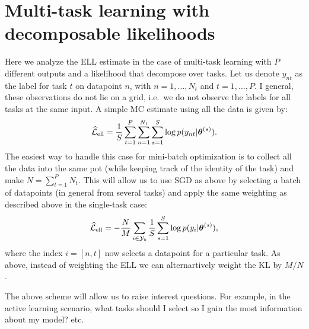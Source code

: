 \documentclass[11pt,a4paper]{article}
\newcommand{\vectheta}{\vecS{\theta}}
\newcommand{\slikesample}[2]{\log p(y_{#1}|\vectheta^{(#2)})}
\newcommand{\elltermhat}{{\widehat{\mathcal{L}}}_{\text{ell}}}
\newcommand{\batch}[1]{{\mathcal{Y}}_{#1}}
\begin{document}
\section{Multi-task learning with decomposable likelihoods}
Here we analyze the ELL estimate in the case of multi-task learning with $P$ different outputs and a likelihood that decompose over tasks. Let us denote $y_{nt}$ as the label for task $t$ on datapoint $n$, with $n=1,\ldots, N_t$ and  $t=1, \ldots, P$. I general, these observations do not lie on a grid, i.e.~we do not observe the labels for all tasks at the same input. A simple MC estimate using all the data is given by:
\begin{align}
	\elltermhat = \frac{1}{S} \sum_{t=1}^{P} \sum_{n=1}^{N_t} \sum_{s=1}^S \slikesample{nt}{s} \text{.}
\end{align}
The easiest way to handle this case for mini-batch optimization is to  collect all the data into the same pot (while keeping track of the identity of the task) and make  $N= \sum_{t=1}^P N_t$. This will allow us to use SGD as above by selecting a batch of datapoints (in general from several tasks) and apply the same weighting as described above in the single-task case:
\begin{equation}
\elltermhat = 	- \frac{N}{M}  \sum_{i \in \batch{b}}  \frac{1}{S} \sum_{s=1}^S  \slikesample{i}{s} \text{,}
\end{equation}
where the index $i=[n,t]$ now selects a datapoint for a particular task. As above, instead of weighting the ELL we can alternartively weight the KL by $M/N$. 

The above scheme will allow us to raise interest questions. For example, in the active learning scenario, what tasks should I select so I gain the most information about my model? etc.
\end{document}
